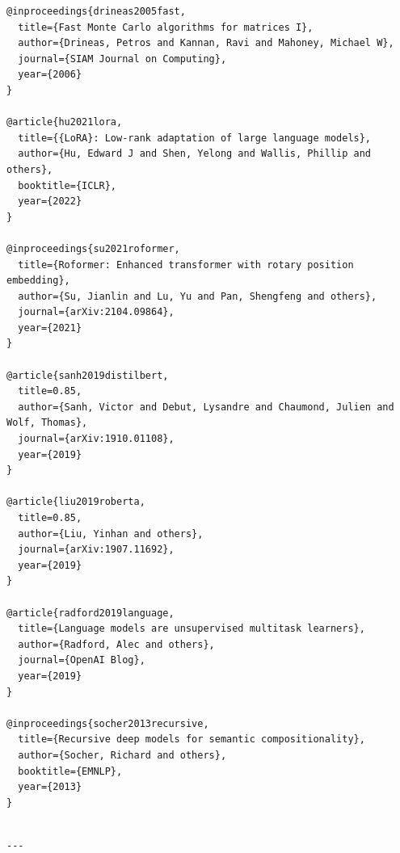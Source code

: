 \begin{lstlisting}
@inproceedings{drineas2005fast,
  title={Fast Monte Carlo algorithms for matrices I},
  author={Drineas, Petros and Kannan, Ravi and Mahoney, Michael W},
  journal={SIAM Journal on Computing},
  year={2006}
}

@article{hu2021lora,
  title={{LoRA}: Low-rank adaptation of large language models},
  author={Hu, Edward J and Shen, Yelong and Wallis, Phillip and others},
  booktitle={ICLR},
  year={2022}
}

@inproceedings{su2021roformer,
  title={Roformer: Enhanced transformer with rotary position embedding},
  author={Su, Jianlin and Lu, Yu and Pan, Shengfeng and others},
  journal={arXiv:2104.09864},
  year={2021}
}

@article{sanh2019distilbert,
  title=0.85,
  author={Sanh, Victor and Debut, Lysandre and Chaumond, Julien and Wolf, Thomas},
  journal={arXiv:1910.01108},
  year={2019}
}

@article{liu2019roberta,
  title=0.85,
  author={Liu, Yinhan and others},
  journal={arXiv:1907.11692},
  year={2019}
}

@article{radford2019language,
  title={Language models are unsupervised multitask learners},
  author={Radford, Alec and others},
  journal={OpenAI Blog},
  year={2019}
}

@inproceedings{socher2013recursive,
  title={Recursive deep models for semantic compositionality},
  author={Socher, Richard and others},
  booktitle={EMNLP},
  year={2013}
}
\end{lstlisting}
\begin{lstlisting}

---
\end{lstlisting}